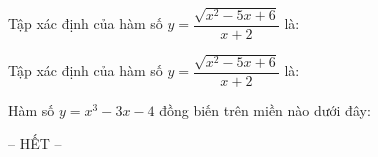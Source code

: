 \documentclass[11pt]{article}
\begin{document}
 \begin{vnmultiplechoice}[title={\examvspace*{0.5cm}\bf II. Các câu hỏi Toán học}, keycolumns=3]%
\begin{block}
\begin{question}
Tập xác định của hàm số $y=\dfrac{\sqrt{x^2-5x+6}}{x+2}$ là:
\datcot
\bapa
{}
{}
{\dung{$(-\infty ,2]\cup [3,+\infty)\setminus \{-2\}$}}
\end{question}
\begin{question}
Tập xác định của hàm số $y=\dfrac{\sqrt{x^2-5x+6}}{x+2}$ là:
\datcot
\haipa
{}
{}
\end{question}
\begin{question}
Hàm số $y=x^3-3x-4$ đồng biến trên miền nào dưới đây:
\datcot
\bapa
{}
{}
{}
\end{question} 
\end{block}

\begin{examclosing}
\centerline{-- HẾT --}
\end{examclosing}

 \end{vnmultiplechoice}
\end{document}
